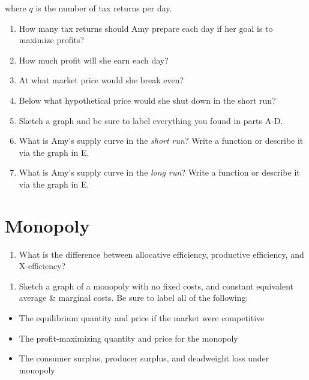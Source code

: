 \documentclass[]{article}
\providecommand{\tightlist}{%
  \setlength{\itemsep}{0pt}\setlength{\parskip}{0pt}}
\begin{document}
where \(q\) is the number of tax returns per day.

\begin{enumerate}
\def\labelenumi{\alph{enumi}.}
\tightlist
\item
  How many tax returns should Amy prepare each day if her goal is to
  maximize profits?
\item
  How much profit will she earn each day?
\item
  At what market price would she break even?
\item
  Below what hypothetical price would she shut down in the short run?
\item
  Sketch a graph and be sure to label everything you found in parts A-D.
\item
  What is Amy's supply curve in the \emph{short run}? Write a function
  or describe it via the graph in E.
\item
  What is Amy's supply curve in the \emph{long run}? Write a function or
  describe it via the graph in E.
\end{enumerate}

\clearpage

\hypertarget{monopoly}{%
\section{Monopoly}\label{monopoly}}

\begin{enumerate}
\def\labelenumi{\arabic{enumi}.}
\setcounter{enumi}{2}
\tightlist
\item
  What is the difference between allocative efficiency, productive
  efficiency, and X-efficiency?
\end{enumerate}

\vspace{3in}

\begin{enumerate}
\def\labelenumi{\arabic{enumi}.}
\setcounter{enumi}{3}
\tightlist
\item
  Sketch a graph of a monopoly with no fixed costs, and constant
  equivalent average \& marginal costs. Be sure to label all of the
  following:
\end{enumerate}

\begin{itemize}
\tightlist
\item
  The equilibrium quantity and price if the market were competitive
\item
  The profit-maximizing quantity and price for the monopoly
\item
  The consumer surplus, producer surplus, and deadweight loss under
  monopoly
\end{itemize}
\end{document}
